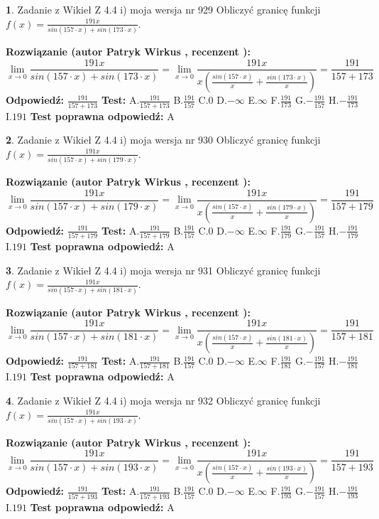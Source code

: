 \documentclass[12pt, a4paper]{article}
\theoremstyle{definition} %
\newtheorem{zad}{}
\newcommand{\zadStart}[1]{\begin{zad}#1\newline}
\newcommand{\zadStop}{\end{zad}}
\newcommand{\rozwStart}[2]{\noindent \textbf{Rozwiązanie (autor #1 , recenzent #2): }\newline}
\newcommand{\rozwStop}{\newline}
\newcommand{\odpStart}{\noindent \textbf{Odpowiedź:}\newline}
\newcommand{\odpStop}{\newline}
\newcommand{\testStart}{\noindent \textbf{Test:}\newline}
\newcommand{\testStop}{\newline}
\newcommand{\kluczStart}{\noindent \textbf{Test poprawna odpowiedź:}\newline}
\newcommand{\kluczStop}{\newline}
\begin{document}
\zadStart{Zadanie z Wikieł Z 4.4 i) moja wersja nr 929}
Obliczyć granicę funkcji $f(x)=\frac{191x}{sin(157\cdot x) +sin(173\cdot x)}$.
\zadStop
\rozwStart{Patryk Wirkus}{}
$$\lim\limits_{x\to 0}\frac{191x}{sin(157\cdot x) +sin(173\cdot x)}=\lim\limits_{x\to 0}\frac{191x}{x(\frac{sin(157\cdot x)}{x}+\frac{sin(173\cdot x)}{x})}=\frac{191}{157+173}$$
\rozwStop
\odpStart
$\frac{191}{157+173}$
\odpStop
\testStart
A.$\frac{191}{157+173}$
B.$\frac{191}{157}$
C.$0$
D.$-\infty$
E.$\infty$
F.$\frac{191}{173}$
G.$-\frac{191}{157}$
H.$-\frac{191}{173}$
I.$191$
\testStop
\kluczStart
A
\kluczStop



\zadStart{Zadanie z Wikieł Z 4.4 i) moja wersja nr 930}
Obliczyć granicę funkcji $f(x)=\frac{191x}{sin(157\cdot x) +sin(179\cdot x)}$.
\zadStop
\rozwStart{Patryk Wirkus}{}
$$\lim\limits_{x\to 0}\frac{191x}{sin(157\cdot x) +sin(179\cdot x)}=\lim\limits_{x\to 0}\frac{191x}{x(\frac{sin(157\cdot x)}{x}+\frac{sin(179\cdot x)}{x})}=\frac{191}{157+179}$$
\rozwStop
\odpStart
$\frac{191}{157+179}$
\odpStop
\testStart
A.$\frac{191}{157+179}$
B.$\frac{191}{157}$
C.$0$
D.$-\infty$
E.$\infty$
F.$\frac{191}{179}$
G.$-\frac{191}{157}$
H.$-\frac{191}{179}$
I.$191$
\testStop
\kluczStart
A
\kluczStop



\zadStart{Zadanie z Wikieł Z 4.4 i) moja wersja nr 931}
Obliczyć granicę funkcji $f(x)=\frac{191x}{sin(157\cdot x) +sin(181\cdot x)}$.
\zadStop
\rozwStart{Patryk Wirkus}{}
$$\lim\limits_{x\to 0}\frac{191x}{sin(157\cdot x) +sin(181\cdot x)}=\lim\limits_{x\to 0}\frac{191x}{x(\frac{sin(157\cdot x)}{x}+\frac{sin(181\cdot x)}{x})}=\frac{191}{157+181}$$
\rozwStop
\odpStart
$\frac{191}{157+181}$
\odpStop
\testStart
A.$\frac{191}{157+181}$
B.$\frac{191}{157}$
C.$0$
D.$-\infty$
E.$\infty$
F.$\frac{191}{181}$
G.$-\frac{191}{157}$
H.$-\frac{191}{181}$
I.$191$
\testStop
\kluczStart
A
\kluczStop



\zadStart{Zadanie z Wikieł Z 4.4 i) moja wersja nr 932}
Obliczyć granicę funkcji $f(x)=\frac{191x}{sin(157\cdot x) +sin(193\cdot x)}$.
\zadStop
\rozwStart{Patryk Wirkus}{}
$$\lim\limits_{x\to 0}\frac{191x}{sin(157\cdot x) +sin(193\cdot x)}=\lim\limits_{x\to 0}\frac{191x}{x(\frac{sin(157\cdot x)}{x}+\frac{sin(193\cdot x)}{x})}=\frac{191}{157+193}$$
\rozwStop
\odpStart
$\frac{191}{157+193}$
\odpStop
\testStart
A.$\frac{191}{157+193}$
B.$\frac{191}{157}$
C.$0$
D.$-\infty$
E.$\infty$
F.$\frac{191}{193}$
G.$-\frac{191}{157}$
H.$-\frac{191}{193}$
I.$191$
\testStop
\kluczStart
A
\kluczStop
\end{document}
